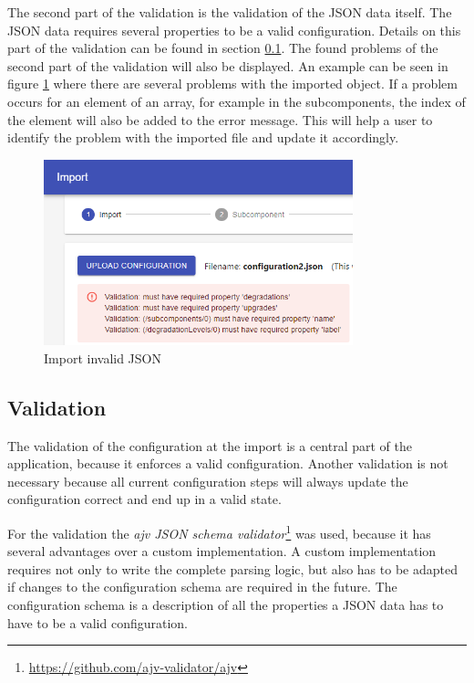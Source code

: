 \noindent The second part of the validation is the validation of the JSON data itself. The JSON data requires several properties to be a valid configuration. Details on this part of the validation can be found in section \ref{sec:validation}.
The found problems of the second part of the validation will also be displayed. An example can be seen in figure \ref{fig:import_invalid_json} where there are several problems with the imported object. If a problem occurs for an element of an array, for example in the subcomponents, the index of the element will also be added to the error message. This will help a user to identify the problem with the imported file and update it accordingly.

\begin{figure}[ht]
    \centering
    \includegraphics[width=0.8\textwidth]{img/import_invalid_json.png}
    \caption{Import invalid JSON}
    \label{fig:import_invalid_json}
\end{figure}

\subsection{Validation}
\label{sec:validation}

The validation of the configuration at the import is a central part of the application, because it enforces a valid configuration. Another validation is not necessary because all current configuration steps will always update the configuration correct and end up in a valid state.

For the validation the \textit{ajv JSON schema validator}\footnote{\url{https://github.com/ajv-validator/ajv}} was used, because it has several advantages over a custom implementation. A custom implementation requires not only to write the complete parsing logic, but also has to be adapted if changes to the configuration schema are required in the future. The configuration schema is a description of all the properties a JSON data has to have to be a valid configuration.

